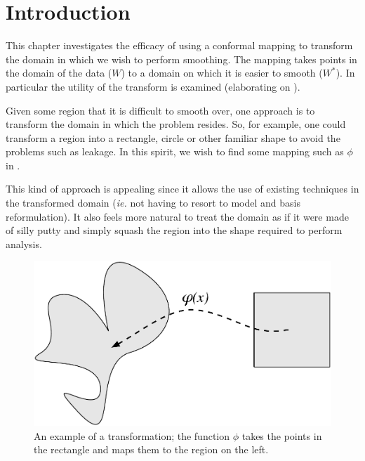 
\label{chap-sc}

\section{Introduction}

This chapter investigates the efficacy of using a conformal mapping to transform the domain in which we wish to perform smoothing. The mapping takes points in the domain of the data ($W$) to a domain on which it is easier to smooth ($W^*$). In particular the utility of the \sch transform is examined (elaborating on \cite{eilerstalk}).

Given some region that it is difficult to smooth over, one approach is to transform the domain in which the problem resides. So, for example, one could transform a region into a rectangle, circle or other familiar shape to avoid the problems such as leakage. In this spirit, we wish to find some mapping such as $\phi$ in .

This kind of approach is appealing since it allows the use of existing techniques in the transformed domain (\emph{ie.} not having to resort to model and basis reformulation). It also feels more natural to treat the domain as if it were made of silly putty and simply squash the region into the shape required to perform analysis.

\begin{figure} [htbp]
\centering
\includegraphics[scale=0.3]{sc/figs/simpledia.pdf}
\caption{An example of a transformation; the function $\phi$ takes the points in the rectangle and maps them to the region on the left.}
\label{simpledia}
\end{figure}

